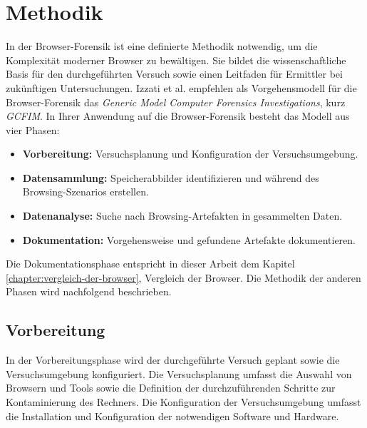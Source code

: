\chapter{Methodik}
\label{chapter:methodik}
In der Browser-Forensik ist eine definierte Methodik notwendig, um die Komplexität moderner Browser zu bewältigen. Sie bildet die wissenschaftliche Basis für den durchgeführten Versuch sowie einen Leitfaden für Ermittler bei zukünftigen Untersuchungen. \cite{Aggarwal.2010, Izzati.2022, Horsman.2019}	
Izzati et al. empfehlen als Vorgehensmodell für die Browser-Forensik das \textit{Generic Model Computer Forensics Investigations}, kurz \textit{GCFIM}. \cite{Yusoff.2011}
In Ihrer Anwendung auf die Browser-Forensik besteht das Modell aus vier Phasen: \cite{Izzati.2022}
\begin{itemize}
	\item \textbf{Vorbereitung:} Versuchsplanung und Konfiguration der Versuchsumgebung.
	\item \textbf{Datensammlung:} Speicherabbilder identifizieren und während des Browsing-Szenarios erstellen. 
	\item \textbf{Datenanalyse:} Suche nach Browsing-Artefakten in gesammelten Daten.
	\item \textbf{Dokumentation:} Vorgehensweise und gefundene Artefakte dokumentieren.
\end{itemize}

Die Dokumentationsphase entspricht in dieser Arbeit dem Kapitel \ref{chapter:vergleich-der-browser}, \glqq{}Vergleich der Browser\grqq{}. Die Methodik der anderen Phasen wird nachfolgend beschrieben.

\section{Vorbereitung}
\label{section:methodik-vorbereitung}
In der Vorbereitungsphase wird der durchgeführte Versuch geplant sowie die Versuchsumgebung konfiguriert. \cite{Izzati.2022} Die Versuchsplanung umfasst die Auswahl von Browsern und Tools sowie die Definition der durchzuführenden Schritte zur Kontaminierung des Rechners. Die Konfiguration der Versuchsumgebung umfasst die Installation und Konfiguration der notwendigen Software und Hardware.


